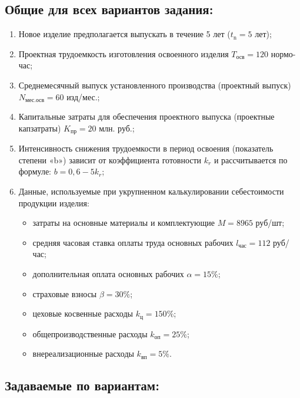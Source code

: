 \subsection*{Общие для всех вариантов задания:}

\begin{enumerate}
    \item Новое изделие предполагается выпускать в течение 5 лет ($t_{\text{n}} = 5$ лет);
    \item Проектная трудоемкость изготовления освоенного изделия $T_{\text{осв}} = 120$ нормо-час;
    \item Среднемесячный выпуск установленного производства (проектный выпуск) $N_{\text{мес.осв}} = 60$ изд/мес.;
    \item Капитальные затраты для обеспечения проектного выпуска (проектные капзатраты) $K_{\text{пр}} = 20$ млн. руб.;
    \item Интенсивность снижения трудоемкости в период освоения (показатель степени «b») зависит от коэффициента готовности
        $k_r$ и рассчитывается по формуле: $b = 0,6 - 5k_r$;
    \item Данные, используемые при укрупненном калькулировании себестоимости продукции изделия:
    \begin{itemize}
        \item затраты на основные материалы и комплектующие $M = 8965$ руб/шт;
        \item средняя часовая ставка оплаты труда основных рабочих $l_{\text{час}} = 112$ руб/час;
        \item дополнительная оплата основных рабочих $\alpha = 15\%$;
        \item страховые взносы $\beta = 30\%$;
        \item цеховые косвенные расходы $k_{\text{ц}} = 150\%$;
        \item общепроизводственные расходы $k_{\text{оп}} = 25\%$;
        \item внереализационные расходы $k_{\text{вп}} = 5\%$.
    \end{itemize}
\end{enumerate}

\subsection*{Задаваемые по вариантам:}

